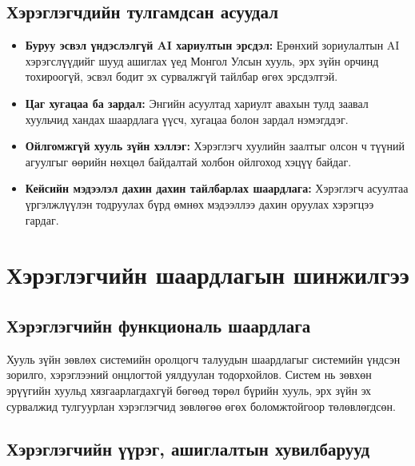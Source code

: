 \subsection{Хэрэглэгчдийн тулгамдсан асуудал}

\begin{itemize}
    \item \textbf{Буруу эсвэл үндэслэлгүй AI хариултын эрсдэл:} Ерөнхий зориулалтын AI хэрэгслүүдийг шууд ашиглах үед Монгол Улсын хууль, эрх зүйн орчинд тохироогүй, эсвэл бодит эх сурвалжгүй тайлбар өгөх эрсдэлтэй.

    \item \textbf{Цаг хугацаа ба зардал:} Энгийн асуултад хариулт авахын тулд заавал хуульчид хандах шаардлага үүсч, хугацаа болон зардал нэмэгддэг.

    \item \textbf{Ойлгомжгүй хууль зүйн хэллэг:} Хэрэглэгч хуулийн заалтыг олсон ч түүний агуулгыг өөрийн нөхцөл байдалтай холбон ойлгоход хэцүү байдаг.

    \item \textbf{Кейсийн мэдээлэл дахин дахин тайлбарлах шаардлага:} Хэрэглэгч асуултаа үргэлжлүүлэн тодруулах бүрд өмнөх мэдээллээ дахин оруулах хэрэгцээ гардаг.
\end{itemize}


\section{Хэрэглэгчийн шаардлагын шинжилгээ}
\subsection{Хэрэглэгчийн функциональ шаардлага}

Хууль зүйн зөвлөх системийн оролцогч талуудын шаардлагыг системийн үндсэн зорилго, хэрэглээний онцлогтой уялдуулан тодорхойлов. Систем нь зөвхөн эрүүгийн хуульд хязгаарлагдахгүй бөгөөд төрөл бүрийн хууль, эрх зүйн эх сурвалжид тулгуурлан хэрэглэгчид зөвлөгөө өгөх боломжтойгоор төлөвлөгдсөн.

\subsection{Хэрэглэгчийн үүрэг, ашиглалтын хувилбарууд}

